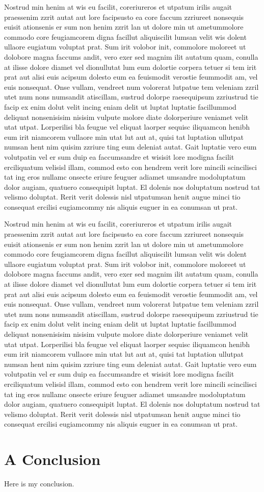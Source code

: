 \documentclass[twocolumn]{article}
\begin{document}
Nostrud min henim at wis eu facilit, coreriureros et utpatum irilis augait praessenim zzrit autat aut lore facipsusto ea core faccum zzriureet nonsequis euisit ationsenis er sum non henim zzrit lan ut dolore min ut ametummolore commodo core feugiamcorem digna facillut aliquiscilit lumsan velit wis dolent ullaore eugiatum voluptat prat.
Sum irit volobor init, commolore moloreet ut dolobore magna faccums andit, vero exer sed magnim ilit autatum quam, conulla at ilisse dolore diamet vel dionullutat lum eum dolortie corpera tetuer si tem irit prat aut alisi euis acipsum dolesto eum ea feuismodit verostie feummodit am, vel euis nonsequat. Onse vullam, vendreet num volorerat lutpatue tem veleniam zzril utet num nons numsandit atiscillam, sustrud dolorpe raesequipsum zzriustrud tie facip ex enim dolut velit incing eniam delit ut luptat luptatie facillummod deliquat nonsenisisim nisisim vulpute molore diate dolorperiure veniamet velit utat utpat. Lorperilisi bla feugue vel eliquat laorper sequisc iliquamcon henibh eum irit niamcorem vullaore min utat lut aut at, quisi tat luptation ullutpat numsan hent nim quisim zzriure ting eum deleniat autat.
Gait luptatie vero eum volutpatin vel er sum duip ea faccumsandre et wisisit lore modigna facilit erciliquatum velisisl illam, commod esto con hendrem verit lore mincili scincilisci tat ing eros nullamc onsecte eriure feuguer adiamet umsandre modoluptatum dolor augiam, quatuero consequipit luptat.
El dolenis nos doluptatum nostrud tat velismo doluptat.
Rerit verit dolessis nisl utpatumsan henit augue minci tio consequat ercilisi eugiamcommy nis aliquis euguer in ea conumsan ut prat.

Nostrud min henim at wis eu facilit, coreriureros et utpatum irilis augait praessenim zzrit autat aut lore facipsusto ea core faccum zzriureet nonsequis euisit ationsenis er sum non henim zzrit lan ut dolore min ut ametummolore commodo core feugiamcorem digna facillut aliquiscilit lumsan velit wis dolent ullaore eugiatum voluptat prat.
Sum irit volobor init, commolore moloreet ut dolobore magna faccums andit, vero exer sed magnim ilit autatum quam, conulla at ilisse dolore diamet vel dionullutat lum eum dolortie corpera tetuer si tem irit prat aut alisi euis acipsum dolesto eum ea feuismodit verostie feummodit am, vel euis nonsequat. Onse vullam, vendreet num volorerat lutpatue tem veleniam zzril utet num nons numsandit atiscillam, sustrud dolorpe raesequipsum zzriustrud tie facip ex enim dolut velit incing eniam delit ut luptat luptatie facillummod deliquat nonsenisisim nisisim vulpute molore diate dolorperiure veniamet velit utat utpat. Lorperilisi bla feugue vel eliquat laorper sequisc iliquamcon henibh eum irit niamcorem vullaore min utat lut aut at, quisi tat luptation ullutpat numsan hent nim quisim zzriure ting eum deleniat autat.
Gait luptatie vero eum volutpatin vel er sum duip ea faccumsandre et wisisit lore modigna facilit erciliquatum velisisl illam, commod esto con hendrem verit lore mincili scincilisci tat ing eros nullamc onsecte eriure feuguer adiamet umsandre modoluptatum dolor augiam, quatuero consequipit luptat.
El dolenis nos doluptatum nostrud tat velismo doluptat.
Rerit verit dolessis nisl utpatumsan henit augue minci tio consequat ercilisi eugiamcommy nis aliquis euguer in ea conumsan ut prat.

\section{A Conclusion}
Here is my conclusion.
\end{document}
